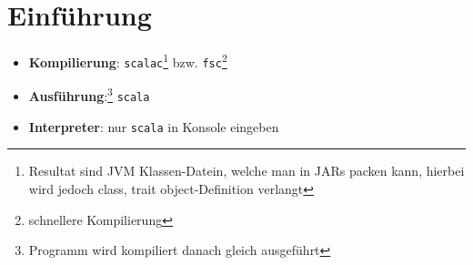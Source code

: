 \newcommand{\home}{../../latex/styles} %





\newcommand{\pdfauthor}{Matthias Günther}
\newcommand{\pdftitle}{git}
\newcommand{\pdfsubject}{Aufzeichnungen zur Fortbildung}
\newcommand{\pdfkeywords}{git, svn, SCM, SVN}
\newcommand{\motto}{Scala - just scale your large applications}
\newcommand{\tutor}{}
\newcommand{\disclaimer}{(Die Autoren übernehmen keine Garantie und Haftung 
für die Korrektheit des Skriptes. Das Skript ist unter den Namen von Matthias 
Günther veröffentlich.)}
\newcommand{\publisher}{Der Helex-Matze Verlag $\sum\limits_{i=1}^{n}i$}
\newcommand{\pdfemail}{matthias.guenther@wikimatze.de}
\newcommand{\correctiontext}{Kommentare/Korrekturen an}
\newcommand{\homepagetext}{Homepage}
\newcommand{\homepage}{wikimatze.de}
\newcommand{\coverdisclaimer}{Copyright Skript-Covers}
\newcommand{\covercopyright}{\textsc{Ubisoft} (\url{ubi.com})}
















\section{Einführung}
\begin{itemize}
  \item \textbf{Kompilierung}: \texttt{scalac}\footnote{Resultat sind JVM
  Klassen-Datein, welche man in JARs packen kann, hierbei wird jedoch class,
  trait \oder object-Definition verlangt} bzw. 
  \texttt{fsc}\footnote{schnellere Kompilierung}
  \item \textbf{Ausführung}:\footnote{Programm wird kompiliert \und danach
  gleich ausgeführt} \texttt{scala}
  \item \textbf{Interpreter}: nur \texttt{scala} in Konsole eingeben
\end{itemize}


